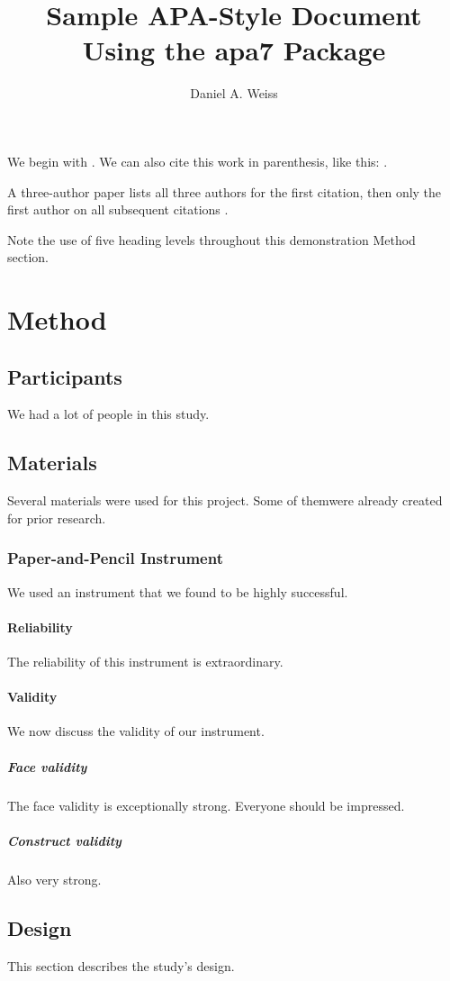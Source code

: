 \documentclass[jou]{apa7}
\title{Sample APA-Style Document Using the \textsf{apa7} Package}
\author{Daniel A. Weiss}
\affiliation{A University Somewhere}
\begin{document}
\maketitle
We begin with \textcite{Shotton1989}.  We can also cite this work in
parenthesis, like this: \parencite{Shotton1989}.

A three-author paper \parencite[e.g.,][]{Lassen2006} lists all
three authors for the first citation, then only the first author
on all subsequent citations \parencite{Lassen2006}.

Note the use of five heading levels throughout this demonstration
Method section.

\section{Method}
\subsection{Participants}
We had a lot of people in this study.

\subsection{Materials}
Several materials were used for this project.  Some of themwere
already created for prior research.

\subsubsection{Paper-and-Pencil Instrument}
We used an instrument that we found to be highly successful.

\paragraph{Reliability}
The reliability of this instrument is extraordinary.

\paragraph{Validity}
We now discuss the validity of our instrument.

\subparagraph{Face validity} The face validity is exceptionally
strong.  Everyone should be impressed.

\subparagraph{Construct validity} Also very strong.

\subsection{Design}
This section describes the study's design.
\end{document}
